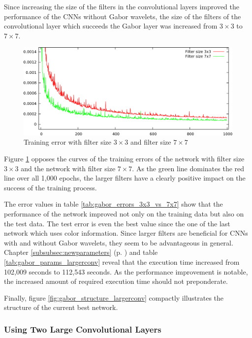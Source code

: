 \documentclass[11pt, a4paper]{article}
\newcommand\myref[1]{\ref{#1} (p. \pageref{#1})}
\begin{document}
Since increasing the size of the filters in the convolutional layers improved the performance of the \acp{CNN} without Gabor wavelets, the size of the filters of the convolutional layer which succeeds the Gabor layer was increased from $3\times3$ to $7\times7$. 
\begin{figure}[h!]
	\centering
	\includegraphics[width=\textwidth]{images/results/gabor_absatan2_largerconv.png}
	\caption{Training error with filter size $3\times3$ and filter size $7\times7$}
	\label{fig:gabor_absatan2_largerconv}
\end{figure}
Figure \ref{fig:gabor_absatan2_largerconv} opposes the curves of the training errors of the network with filter size $3\times3$ and the network with filter size $7\times7$. As the green line dominates the red line over all 1,000 epochs, the larger filters have a clearly positive impact on the success of the training process. 

The error values in table \ref{tab:gabor_errors_3x3_vs_7x7} show that the performance of the network improved not only on the training data but also on the test data. The test error is even the best value since the one of the last network which uses color information. Since larger filters are beneficial for \acp{CNN} with and without Gabor wavelets, they seem to be advantageous in general. Chapter \myref{subsubsec:newparameters} and table \ref{tab:gabor_params_largerconv} reveal that the execution time increased from 102,009 seconds to 112,543 seconds. As the performance improvement is notable, the increased amount of required execution time should not preponderate.



Finally, figure \ref{fig:gabor_structure_largerconv} compactly illustrates the structure of the current best network.



\subsubsection{Using Two Large Convolutional Layers}
\end{document}
